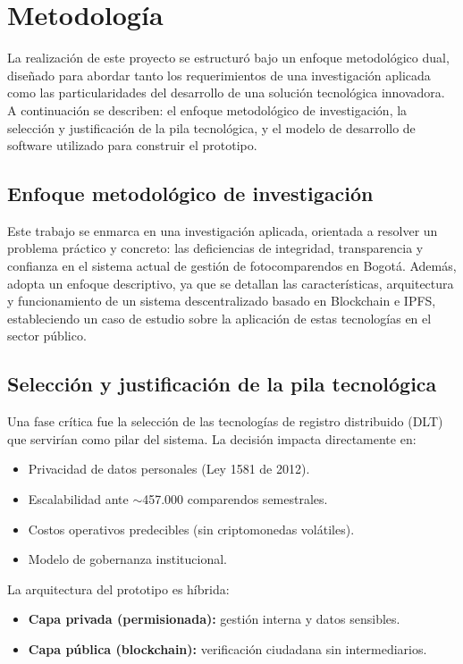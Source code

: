 \section{Metodología}

La realización de este proyecto se estructuró bajo un enfoque metodológico dual, diseñado para abordar tanto los requerimientos de una investigación aplicada como las particularidades del desarrollo de una solución tecnológica innovadora. A continuación se describen: el enfoque metodológico de investigación, la selección y justificación de la pila tecnológica, y el modelo de desarrollo de software utilizado para construir el prototipo.

\subsection{Enfoque metodológico de investigación}

Este trabajo se enmarca en una investigación aplicada, orientada a resolver un problema práctico y concreto: las deficiencias de integridad, transparencia y confianza en el sistema actual de gestión de fotocomparendos en Bogotá. Además, adopta un enfoque descriptivo, ya que se detallan las características, arquitectura y funcionamiento de un sistema descentralizado basado en Blockchain e IPFS, estableciendo un caso de estudio sobre la aplicación de estas tecnologías en el sector público.

\subsection{Selección y justificación de la pila tecnológica}

Una fase crítica fue la selección de las tecnologías de registro distribuido (DLT) que servirían como pilar del sistema. La decisión impacta directamente en:

\begin{itemize}
    \item Privacidad de datos personales (Ley 1581 de 2012).
    \item Escalabilidad ante $\sim$457.000 comparendos semestrales.
    \item Costos operativos predecibles (sin criptomonedas volátiles).
    \item Modelo de gobernanza institucional.
\end{itemize}

La arquitectura del prototipo es híbrida:
\begin{itemize}
    \item \textbf{Capa privada (permisionada):} gestión interna y datos sensibles.
    \item \textbf{Capa pública (blockchain):} verificación ciudadana sin intermediarios.
\end{itemize}

